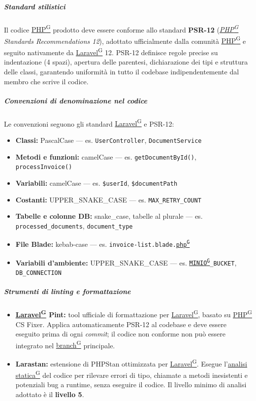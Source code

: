 \documentclass[a4paper,12pt]{article}
\providecommand{\glslink}[2]{\href{https://alittlebyte-19.github.io/Documentazione/glossario.html\#gls-#1}{\underline{#2}\textsuperscript{\scriptsize G}}}
\begin{document}
\subparagraph{Standard stilistici}
Il codice \glslink{php}{PHP} prodotto deve essere conforme allo standard \textbf{PSR-12} (\textit{\glslink{php}{PHP} Standards Recommendations 12}), adottato ufficialmente dalla comunità \glslink{php}{PHP} e seguito nativamente da \glslink{laravel}{Laravel} 12. PSR-12 definisce regole precise su indentazione (4 spazi), apertura delle parentesi, dichiarazione dei tipi e struttura delle classi, garantendo uniformità in tutto il codebase indipendentemente dal membro che scrive il codice.

\subparagraph{Convenzioni di denominazione nel codice}
Le convenzioni seguono gli standard \glslink{laravel}{Laravel} e PSR-12:
\begin{itemize}
    \item \textbf{Classi:} PascalCase — es. \texttt{UserController}, \texttt{DocumentService}
    \item \textbf{Metodi e funzioni:} camelCase — es. \texttt{getDocumentById()}, \texttt{processInvoice()}
    \item \textbf{Variabili:} camelCase — es. \texttt{\$userId}, \texttt{\$documentPath}
    \item \textbf{Costanti:} UPPER\_SNAKE\_CASE — es. \texttt{MAX\_RETRY\_COUNT}
    \item \textbf{Tabelle e colonne DB:} snake\_case, tabelle al plurale — es. \texttt{processed\_documents}, \texttt{document\_type}
    \item \textbf{File Blade:} kebab-case — es. \texttt{invoice-list.blade.\glslink{php}{php}}
    \item \textbf{Variabili d'ambiente:} UPPER\_SNAKE\_CASE — es. \texttt{\glslink{minio}{MINIO}\_BUCKET}, \texttt{DB\_CONNECTION}
\end{itemize}

\subparagraph{Strumenti di linting e formattazione}
\begin{itemize}
    \item \textbf{\glslink{laravel}{Laravel} Pint:} tool ufficiale di formattazione per \glslink{laravel}{Laravel}, basato su \glslink{php}{PHP} CS Fixer. Applica automaticamente PSR-12 al codebase e deve essere eseguito prima di ogni \textit{commit}; il codice non conforme non può essere integrato nel \glslink{branch}{branch} principale.
    \item \textbf{Larastan:} estensione di PHPStan ottimizzata per \glslink{laravel}{Laravel}. Esegue l'\glslink{analisi-statica}{analisi statica} del codice per rilevare errori di tipo, chiamate a metodi inesistenti e potenziali bug a runtime, senza eseguire il codice. Il livello minimo di analisi adottato è il \textbf{livello 5}.
\end{itemize}
\end{document}

